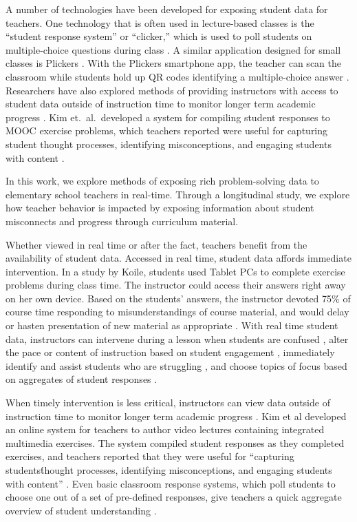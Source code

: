 \documentclass{sigchi}
\begin{document}
A number of technologies have been developed for exposing student data for teachers. One technology that is often used in lecture-based classes is the ``student response system'' or ``clicker,'' which is used to poll students on multiple-choice questions during class \cite{Dangel08, Lazar2007}. A similar application designed for small classes is Plickers \cite{Plickers}. With the Plickers smartphone app, the teacher can scan the classroom while students hold up QR codes identifying a multiple-choice answer \cite{Plickers}. Researchers have also explored methods of providing instructors with access to student data outside of instruction time to monitor longer term academic progress \cite{Zhang2015, Arnold2012}. Kim et.\ al.\ developed a system for compiling student responses to MOOC exercise problems, which teachers reported were useful for capturing student thought processes, identifying misconceptions, and engaging students with content \cite{Kim2015}.

In this work, we explore methods of exposing rich problem-solving data to elementary school teachers in real-time. Through a longitudinal study, we explore how teacher behavior is impacted by exposing information about student misconnects and progress through curriculum material.

Whether viewed in real time or after the fact, teachers benefit from the availability of student data. Accessed in real time, student data affords immediate intervention. In a study by Koile, students used Tablet PCs to complete exercise problems during class time. The instructor could access their answers right away on her own device. Based on the students' answers, the instructor devoted 75\% of course time responding to misunderstandings of course material, and would delay or hasten presentation of new material as appropriate \cite{Koile2006}. With real time student data, instructors can intervene during a lesson when students are confused \cite{Hickey2014}, alter the pace or content of instruction based on student engagement \cite{Balaam2010}, immediately identify and assist students who are struggling \cite{Lazar2007}, and choose topics of focus based on aggregates of student responses \cite{Koile2006}.

When timely intervention is less critical, instructors can view data outside of instruction time to
monitor longer term academic progress \cite{Zhang2015, Arnold2012}. Kim et al developed an online system for teachers to author video lectures containing integrated multimedia exercises. The system compiled student responses as they completed exercises, and teachers reported that they were useful for ``capturing students\' thought processes, identifying misconceptions, and engaging students with content'' \cite{Kim2015}. Even basic classroom response systems, which poll students to choose one out of a set of pre-defined responses, give teachers a quick aggregate overview of student understanding \cite{Lazar2007}.
\end{document}
